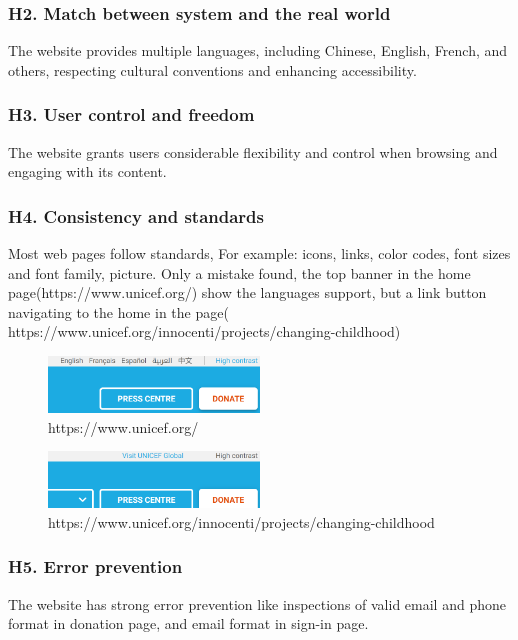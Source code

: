 \subsubsection*{H2. Match between system and the real world}
The website provides multiple languages, including Chinese, English, French, and others, respecting cultural conventions and enhancing accessibility.

\subsubsection*{H3. User control and freedom }
The website grants users considerable flexibility and control when browsing and engaging with its content.

\subsubsection*{H4. Consistency and standards}
Most web pages follow standards, For example: icons, links, color codes, font sizes and font family, picture. 
Only a mistake found, the top banner in the home page(https://www.unicef.org/) show the languages support, but a link button navigating to the home in the page( https://www.unicef.org/innocenti/projects/changing-childhood)
\begin{figure}[h]
	\centering
	\includegraphics[width=0.5\textwidth]{Images/yan_h4_1.png}
	\caption{https://www.unicef.org/}
	\label{fig:h4_1}
\end{figure}
\begin{figure}[h]
	\centering
	\includegraphics[width=0.5\textwidth]{Images/yan_h4_2.png}
	\caption{https://www.unicef.org/innocenti/projects/changing-childhood}
	\label{fig:h4_2}
\end{figure}

\subsubsection*{H5. Error prevention }
The website has strong error prevention like inspections of valid email and phone format in donation page, and email format in sign-in page. 


